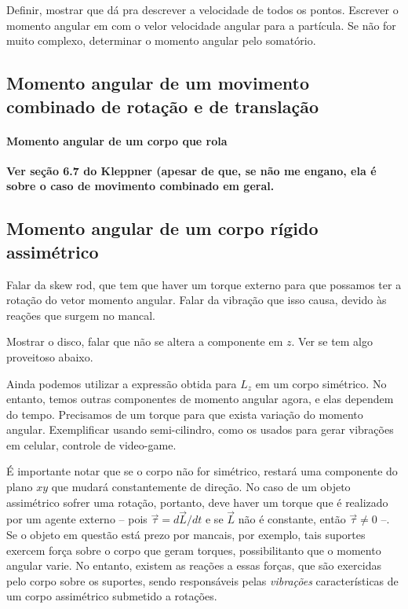 Definir, mostrar que dá pra descrever a velocidade de todos os pontos. Escrever o momento angular em com o velor velocidade angular para a partícula. Se não for muito complexo, determinar o momento angular pelo somatório.

\subsection{Momento angular de um movimento combinado de rotação e de translação}

\paragraph{Momento angular de um corpo que rola}

\textbf{Ver seção 6.7 do Kleppner (apesar de que, se não me engano, ela é sobre o caso de movimento combinado em geral.}

\subsection{Momento angular de um corpo rígido assimétrico}

Falar da skew rod, que tem que haver um torque externo para que possamos ter a rotação do vetor momento angular. Falar da vibração que isso causa, devido às reações que surgem no mancal.

Mostrar o disco, falar que não se altera a componente em $z$. Ver se tem algo proveitoso abaixo.


Ainda podemos utilizar a expressão obtida para $L_z$ em um corpo simétrico. No entanto, temos outras componentes de momento angular agora, e elas dependem do tempo. Precisamos de um torque para que exista variação do momento angular. Exemplificar usando semi-cilindro, como os usados para gerar vibrações em celular, controle de video-game.

É importante notar que se o corpo não for simétrico, restará uma componente do plano $xy$ que mudará constantemente de direção. No caso de um objeto assimétrico sofrer uma rotação, portanto, deve haver um torque que é realizado por um agente externo -- pois $\vec{\tau} = d\vec{L} / dt$ e se $\vec{L}$ não é constante, então $\vec{\tau} \neq 0$ --. Se o objeto em questão está prezo por mancais, por exemplo, tais suportes exercem força sobre o corpo que geram torques, possibilitanto que o momento angular varie. No entanto, existem as reações a essas forças, que são exercidas pelo corpo sobre os suportes, sendo responsáveis pelas \emph{vibrações} características de um corpo assimétrico submetido a rotações.


